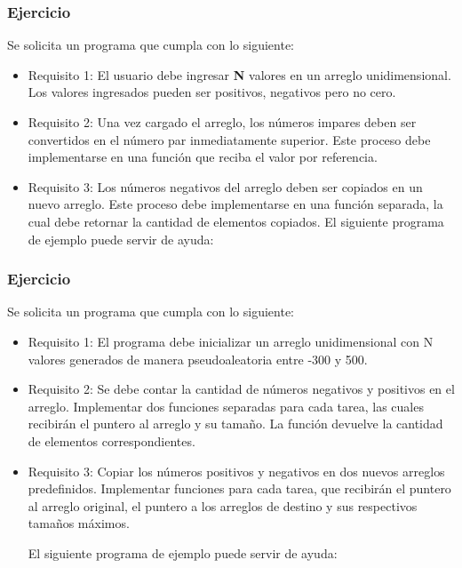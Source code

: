 \subsubsection{Ejercicio}
Se solicita un programa que cumpla con lo siguiente:
\begin{itemize}[a)]
  \item Requisito 1:
    El usuario debe ingresar \textbf{N} valores en un arreglo unidimensional. Los valores ingresados pueden ser positivos, negativos pero no cero.
  \item Requisito 2:
    Una vez cargado el arreglo, los números impares deben ser convertidos en el número par inmediatamente superior. Este proceso debe implementarse en una función que reciba el valor por referencia.
  \item Requisito 3:
    Los números negativos del arreglo deben ser copiados en un nuevo arreglo. Este proceso debe implementarse en una función separada, la cual debe retornar la cantidad de elementos copiados.
    El siguiente programa de ejemplo puede servir de ayuda:

    \lstset{inputencoding=utf8/latin1}
    
\end{itemize}

\subsubsection{Ejercicio}
Se solicita un programa que cumpla con lo siguiente:
\begin{itemize}[a)]
  \item Requisito 1:
    El programa debe inicializar un arreglo unidimensional con N valores generados de manera pseudoaleatoria entre -300 y 500.

  \item Requisito 2:
    Se debe contar la cantidad de números negativos y positivos en el arreglo. Implementar dos funciones separadas para cada tarea, las cuales recibirán el puntero al arreglo y su tamaño. La función devuelve la cantidad de elementos correspondientes.

  \item Requisito 3:
    Copiar los números positivos y negativos en dos nuevos arreglos predefinidos. Implementar funciones para cada tarea, que recibirán el puntero al arreglo original, el puntero a los arreglos de destino y sus respectivos tamaños máximos.

    El siguiente programa de ejemplo puede servir de ayuda:

    \lstset{inputencoding=utf8/latin1}
    
\end{itemize}


